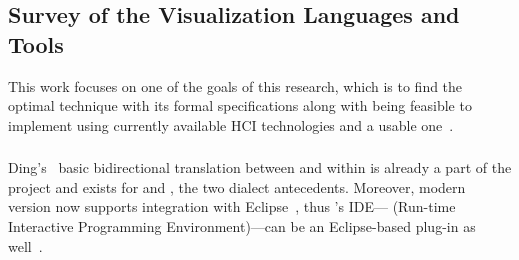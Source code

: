 \subsection{Survey of the Visualization Languages and Tools}

This work focuses on one of the goals of this research, which is to find the 
optimal technique with its formal specifications along with being feasible to 
implement using currently available HCI technologies and a usable one~\cite{flucid-dfg-viz-pst2011}.
%

\subsubsection{{\graphviz}}

Ding's~\cite{yimin04} basic bidirectional translation between {\gipl} and
{\dfg} within {\gipsy} is already a part of the project and exists for {\gipl} 
and {\ilucid}, the two {\lucid} dialect antecedents. Moreover, {\graphviz}
modern version now supports integration with Eclipse~\cite{eclipse}, thus
{\gipsy}'s IDE---{\ripe} (Run-time Interactive Programming Environment)---can be 
an Eclipse-based plug-in as well~\cite{flucid-dfg-viz-pst2011}.

